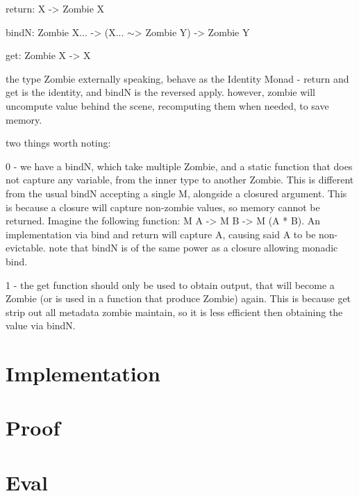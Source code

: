 \documentclass[acmsmall]{acmart}
\begin{document}
	return: X -> Zombie X

	bindN: Zombie X... -> (X... $\sim$> Zombie Y) -> Zombie Y

	get: Zombie X -> X
	
	the type Zombie externally speaking, behave as the Identity Monad - return and get is the identity, and bindN is the reversed apply. however, zombie will uncompute value behind the scene, recomputing them when needed, to save memory.
	
	two things worth noting:
	
	0 - we have a bindN, which take multiple Zombie, and a static function that does not capture any variable, from the inner type to another Zombie. This is different from the usual bindN accepting a single M, alongside a closured argument. This is because a closure will capture non-zombie values, so memory cannot be returned. Imagine the following function: M A -> M B -> M (A * B). An implementation via bind and return will capture A, causing said A to be non-evictable. note that bindN is of the same power as a closure allowing monadic bind.
	
	1 - the get function should only be used to obtain output, that will become a Zombie (or is used in a function that produce Zombie) again. This is because get strip out all metadata zombie maintain, so it is less efficient then obtaining the value via bindN.
	
	\section{Implementation}
	
	\section{Proof}
	
	\section{Eval}
\appendix
\end{document}
